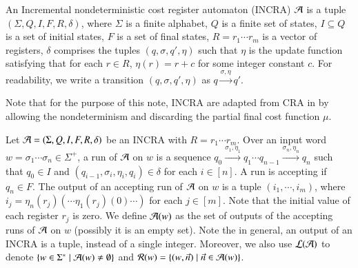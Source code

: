 \documentclass[sigplan,review,anonymous]{acmart}\settopmatter{printfolios=true,printccs=false,printacmref=false}
\begin{document}
\begin{definition}
	
	An Incremental nondeterministic cost register automaton (INCRA) $\mathcal{A}$ is a tuple $(\Sigma, Q, I, F, R, \delta)$, where $\Sigma$ is a finite alphabet, $Q$ is a finite set of states, $I\subseteq Q$ is a set of initial states, $F$ is a set of final states, $R=r_1\cdots r_m$ is a vector of registers, $\delta$ comprises the tuples $(q, \sigma, q', \eta)$ such that $\eta$ is the update function satisfying that for each $r \in R$, $\eta(r) = r+c$ for some integer constant $c$. For readability, we write a transition $(q, \sigma, q', \eta)$ as $q \xrightarrow{\sigma, \eta} q'$.
\end{definition}

Note that for the purpose of this note, INCRA are adapted from CRA in \cite{RLJ+13} by allowing the nondeterminism and discarding the partial final cost function $\mu$.

Let $\mathcal{A}=(\Sigma, Q, I, F, R, \delta)$ be an INCRA with $R=r_1\cdots r_m$. Over an input word $w=\sigma_1 \cdots \sigma_n \in \Sigma^+$, a run of $\mathcal{A}$ on $w$ is a sequence $q_0 \xrightarrow{\sigma_1, \eta_1} q_1 \cdots q_{n-1} \xrightarrow{\sigma_n, \eta_n} q_n$ such that $q_0 \in I$ and $(q_{i-1}, \sigma_i, \eta_i, q_i) \in \delta$ for each $i \in [n]$. A run is accepting if $q_n \in F$. The output of an accepting run of $\mathcal{A}$ on $w$ is a tuple $(i_1,\cdots, i_m)$, where $i_j = \eta_n(r_j) (\cdots \eta_1(r_j)(0)\cdots)$ for each $j \in [m]$. Note that the initial value of each register $r_j$ is zero. We define $\mathcal{A}(w)$ as the set of outputs of the accepting runs of $\mathcal{A}$ on $w$ (possibly it is an empty set). Note the in general, an output of an INCRA is a tuple, instead of a single integer. Moreover, we also use $\mathcal{L}(\mathcal{A})$ to denote $\{w \in \Sigma^* \mid \mathcal{A}(w) \neq \emptyset\}$ and $\mathcal{R}(w) = \{(w, \vec{n}) \mid \vec{n} \in \mathcal{A}(w)\}$.
\end{document}
